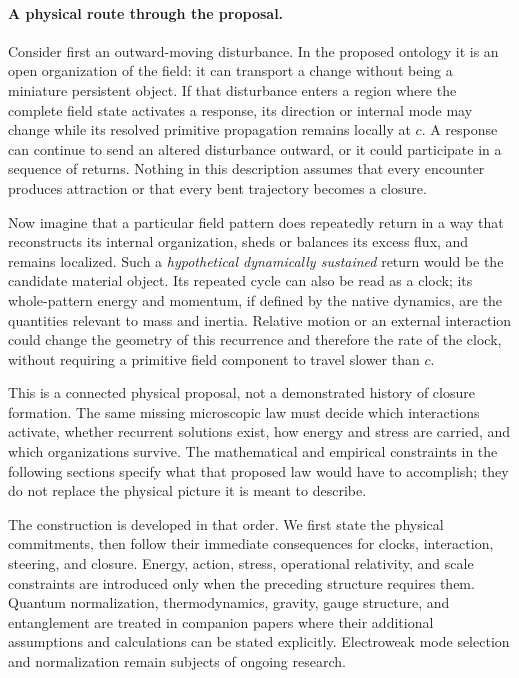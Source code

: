\documentclass[11pt]{article}
\theoremstyle{definition}
\begin{document}
\paragraph{A physical route through the proposal.}
Consider first an outward-moving disturbance.  In the proposed ontology it is an open
organization of the field: it can transport a change without being a miniature
persistent object.  If that disturbance enters a region where the complete field
state activates a response, its direction or internal mode may change while its
resolved primitive propagation remains locally at $c$.  A response can continue
to send an altered disturbance outward, or it could participate in a sequence
of returns.  Nothing in this description assumes that every encounter produces
attraction or that every bent trajectory becomes a closure.

Now imagine that a particular field pattern does repeatedly return in a way that
reconstructs its internal organization, sheds or balances its excess flux, and
remains localized.  Such a \emph{hypothetical dynamically sustained} return would
be the candidate material object.  Its repeated cycle can also be read as a clock;
its whole-pattern energy and momentum, if defined by the native dynamics, are the
quantities relevant to mass and inertia.  Relative motion or an external interaction
could change the geometry of this recurrence and therefore the rate of the clock,
without requiring a primitive field component to travel slower than $c$.

This is a connected physical proposal, not a demonstrated history of closure formation.
The same missing microscopic law must decide which interactions activate, whether
recurrent solutions exist, how energy and stress are carried, and which organizations
survive.  The mathematical and empirical constraints in the following sections
specify what that proposed law would have to accomplish; they do not replace the
physical picture it is meant to describe.

The construction is developed in that order.  We first state the physical commitments,
then follow their immediate consequences for clocks, interaction, steering, and closure.
Energy, action, stress, operational relativity, and scale constraints are introduced only
when the preceding structure requires them.  Quantum normalization, thermodynamics, gravity,
gauge structure, and entanglement are treated in companion papers where their additional
assumptions and calculations can be stated explicitly. Electroweak mode selection and
normalization remain subjects of ongoing research.
\end{document}
